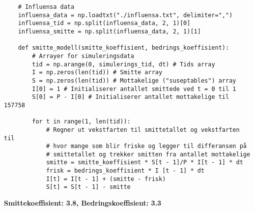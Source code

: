 \documentclass[12pt]{article}
\begin{document}
\begin{Codesnippet}
    \begin{verbatim}
    # Influensa data
    influensa_data = np.loadtxt("./influensa.txt", delimiter=",")
    influensa_tid = np.split(influensa_data, 2, 1)[0]
    influensa_smitte = np.split(influensa_data, 2, 1)[1]

    def smitte_modell(smitte_koeffisient, bedrings_koeffisient):
        # Arrayer for simuleringsdata
        tid = np.arange(0, simulerings_tid, dt) # Tids array
        I = np.zeros(len(tid)) # Smitte array
        S = np.zeros(len(tid)) # Mottakelige ("suseptables") array
        I[0] = 1 # Initialiserer antallet smittede ved t = 0 til 1
        S[0] = P - I[0] # Initialiserer antallet mottakelige til 157758

        for t in range(1, len(tid)):                
            # Regner ut vekstfarten til smittetallet og vekstfarten til 
            # hvor mange som blir friske og legger til differansen på
            # smittetallet og trekker smitten fra antallet mottakelige
            smitte = smitte_koeffisient * S[t - 1]/P * I[t - 1] * dt
            frisk = bedrings_koeffisient * I [t - 1] * dt
            I[t] = I[t - 1] + (smitte - frisk)
            S[t] = S[t - 1] - smitte
    \end{verbatim}
\end{Codesnippet}

\begin{center}
    \large{\textbf{Smittekoeffisient: 3.8, Bedringskoeffisient: 3.3}}\\
    \hphantom{---------}\\
    \hphantom{---------}
\end{center}
\end{document}
